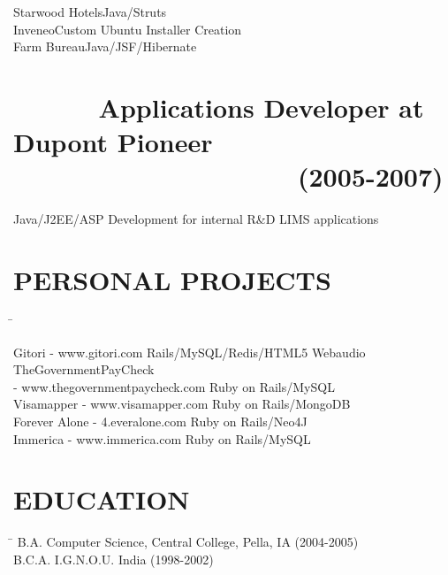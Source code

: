 \documentclass{res}
\begin{document}
\begin{resume}
\begin{tabbing}
Starwood Hotels\>Java/Struts\\

Inveneo\>Custom Ubuntu Installer Creation\\

Farm Bureau\>Java/JSF/Hibernate \\
 \end{tabbing}
\section {\ \ \ \ \ \ Applications Developer at Dupont Pioneer \textnormal{\ \ \ \ \ \ \ \ \ \ \ \  \ \ \ \ \ \ \ \ (2005-2007)}}\vspace{0.05in}
   \begin{tabbing}
Java/J2EE/ASP Development for internal R\&D LIMS applications
\end{tabbing}
\vspace{0.1in}         
\section{PERSONAL PROJECTS}  \vspace{-0.01in}   
   \begin{tabbing}
   \hspace{3.3in}\= \kill %

    Gitori - www.gitori.com   \>Rails/MySQL/Redis/HTML5 Webaudio \\

    TheGovernmentPayCheck \\- www.thegovernmentpaycheck.com   \>Ruby on Rails/MySQL\\

    Visamapper - www.visamapper.com   \>Ruby on Rails/MongoDB \\
 
    Forever Alone - 4.everalone.com \>Ruby on Rails/Neo4J \\

    Immerica - www.immerica.com \>Ruby on Rails/MySQL\\

\end{tabbing}

\section{EDUCATION}\vspace{0.05in}
\begin{tabbing}
\hspace{3.3in}\= \kill %
        B.A. Computer Science, Central College, Pella, IA  \>(2004-2005) \\
        B.C.A. I.G.N.O.U. India  \>(1998-2002) \\
\end{tabbing}
\vspace{0.01in}         

\end{resume}
\end{document}
